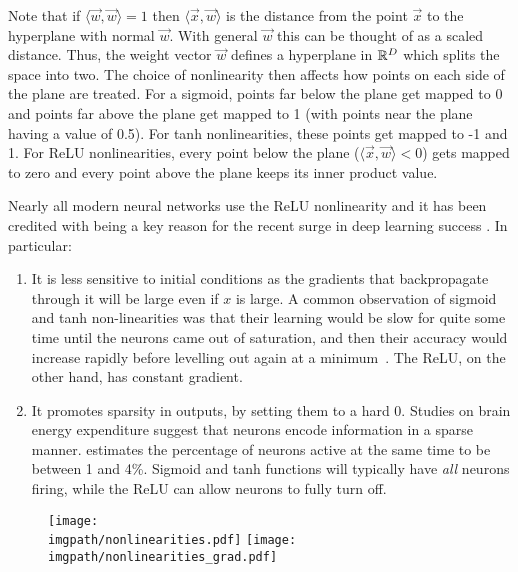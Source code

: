 Note that if $\langle\vec{w}, \vec{w}\rangle = 1$ then $\langle\vec{x},
\vec{w}\rangle$ is the distance from the point $\vec{x}$ to the hyperplane with
normal $\vec{w}$. With general $\vec{w}$ this can be thought of as a scaled
distance. Thus, the weight vector $\vec{w}$ defines a hyperplane in $\reals[D]$
which splits the space into two. The choice of nonlinearity then affects how
points on each side of the plane are treated. For a sigmoid, points far below
the plane get mapped to 0 and points far above the plane get mapped to 1 (with
points near the plane having a value of 0.5). For tanh nonlinearities, these
points get mapped to -1 and 1. For ReLU nonlinearities, every point below the
plane ($\langle\vec{x}, \vec{w}\rangle < 0$) gets mapped to zero and every point
above the plane keeps its inner product value. 

Nearly all modern neural networks use the ReLU nonlinearity and it has
been credited with being a key reason for the recent surge in deep learning
success \cite{glorot_deep_2011, nair_rectified_2010}. In particular:
\begin{enumerate}
\item It is less sensitive to initial conditions as the gradients that
  backpropagate through it will be large even if $x$ is large. A common
  observation of sigmoid and tanh non-linearities was that their learning would
  be slow for quite some time until the neurons came out of saturation, and then
  their accuracy would increase rapidly before levelling out again at
  a minimum~\cite{glorot_understanding_2010}. The ReLU, on the other hand, has
  constant gradient.
\item It promotes sparsity in outputs, by setting them to a hard 0. Studies
  on brain energy expenditure suggest that neurons encode information in
  a sparse manner. \cite{lennie_cost_2003} estimates the percentage of
  neurons active at the same time to be between 1 and 4\%. Sigmoid and tanh
  functions will typically have \emph{all} neurons firing, while 
  the ReLU can allow neurons to fully turn off.
\end{enumerate}

\begin{figure}
    \qquad
    \texttt{[image: \\imgpath/nonlinearities.pdf]}
    \quad
    \texttt{[image: \\imgpath/nonlinearities\_grad.pdf]}
  \centering
  \label{fig:ch2:nonlinearities}
\end{figure}

